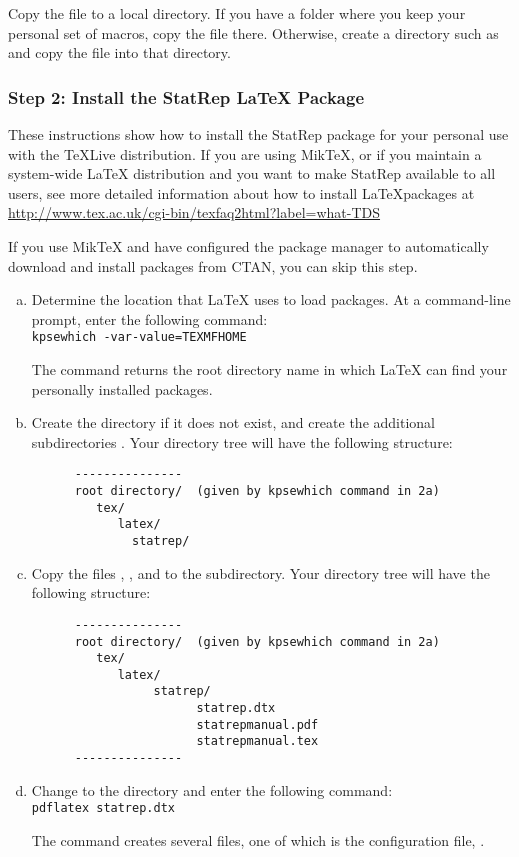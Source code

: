 \documentclass[article,oneside]{memoir}
\begin{document}
   Copy the file  to a local directory. If you have a
   folder where you keep your personal set of macros, copy the file
   there. Otherwise, create a directory such as 
    and copy the file into that directory.

\subsubsection{Step 2: Install the StatRep LaTeX Package}

   These instructions show how to install the StatRep package
   for your personal use with the \TeX Live distribution.
   If you are using Mik\TeX, or if you maintain a system-wide 
   LaTeX distribution and
   you want to make StatRep available to all users, see more
   detailed information about how to install \LaTeX packages at
   \url{http://www.tex.ac.uk/cgi-bin/texfaq2html?label=what-TDS}
   
   If you use Mik\TeX{} and have configured the package manager to 
   automatically download and install packages from CTAN, you can
   skip this step.
   
  \begin{enumerate}[a)]
   \item
   Determine the location that LaTeX uses to load packages. At a
   command-line prompt, enter the following command:\\
   \texttt{kpsewhich -var-value=TEXMFHOME}

   The command returns the root directory name in which LaTeX can
   find your personally installed packages.

   \item
   Create the directory if it does not exist, and create the additional
   subdirectories .
   Your directory tree will have the following structure:
\clearpage
\begin{verbatim}
      ---------------
      root directory/  (given by kpsewhich command in 2a)
         tex/
            latex/
              statrep/
\end{verbatim}
  \item
   Copy the files , , and  to
   the  subdirectory. Your directory tree will have the following structure:
\begin{verbatim}
      ---------------
      root directory/  (given by kpsewhich command in 2a)
         tex/
            latex/
                 statrep/
                       statrep.dtx
                       statrepmanual.pdf
                       statrepmanual.tex
      ---------------
\end{verbatim}
   \item
   Change to the  directory and enter the following command:\\
   \texttt{pdflatex statrep.dtx}

   The command creates several files, one of which is the configuration
   file, .
\end{enumerate}
\end{document}
